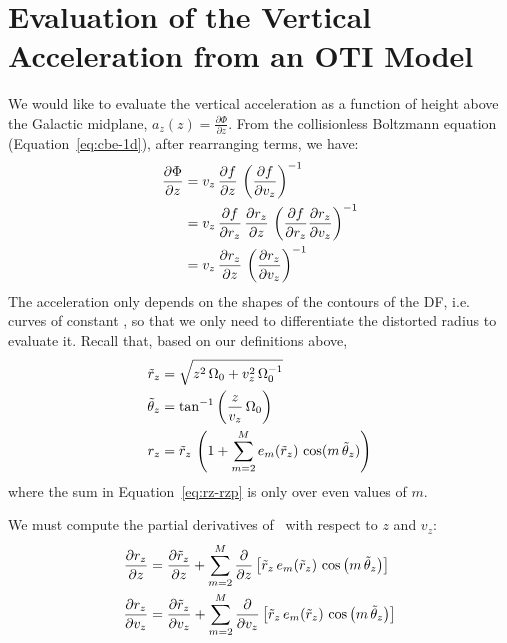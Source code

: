 \appendix

\section{Evaluation of the Vertical Acceleration from an OTI Model}
\label{sec:appendix-math}

We would like to evaluate the vertical acceleration as a function of height above the
Galactic midplane, $a_z(z) = \frac{\partial \Phi}{\partial z}$.
From the collisionless Boltzmann equation (Equation~\ref{eq:cbe-1d}), after rearranging
terms, we have:
\begin{align}
    \frac{\partial \Phi}{\partial z} &=
        v_z \, \frac{\partial f}{\partial z} \,
        \left( \frac{\partial f}{\partial v_z} \right)^{-1} \\
    &= v_z \, \frac{\partial f}{\partial r_z} \, \frac{\partial r_z}{\partial z} \,
        \left( \frac{\partial f}{\partial r_z} \frac{\partial r_z}{\partial v_z} \right)^{-1} \\
        &= v_z \, \frac{\partial r_z}{\partial z} \,
        \left( \frac{\partial r_z}{\partial v_z} \right)^{-1}
\end{align}
The acceleration only depends on the shapes of the contours of the DF, i.e. curves of
constant \rz, so that we only need to differentiate the distorted radius to evaluate it.
Recall that, based on our definitions above,
\begin{align}
    \tilde{r}_z &= \sqrt{z^2 \, \Omega_0 + v_z^2 \, \Omega_0^{-1}} \\
    \tilde{\theta}_z &= \tan^{-1}\left(\frac{z}{v_z} \, \Omega_0\right) \\
    r_z &= \tilde{r}_z \, \left( 1 + \sum_{m=2}^{M} e_m(\tilde{r}_z) \,
        \cos(m \, \tilde{\theta}_z) \right) \label{eq:rz-rzp}
\end{align}
where the sum in Equation~\ref{eq:rz-rzp} is only over even values of $m$.

We must compute the partial derivatives of \rz\ with respect to $z$ and $v_z$:
\begin{align}
    \frac{\partial r_z}{\partial z} &=
        \frac{\partial \tilde{r}_z}{\partial z} +
        \sum_{m=2}^{M} \frac{\partial}{\partial z} \left[\tilde{r}_z \, e_m(\tilde{r}_z) \, \cos\left(m \, \tilde{\theta}_z\right)\right]\\
    \frac{\partial r_z}{\partial v_z} &=
        \frac{\partial \tilde{r}_z}{\partial v_z} +
        \sum_{m=2}^{M} \frac{\partial}{\partial v_z} \left[\tilde{r}_z \, e_m(\tilde{r}_z) \, \cos\left(m \, \tilde{\theta}_z\right)\right]
\end{align}

